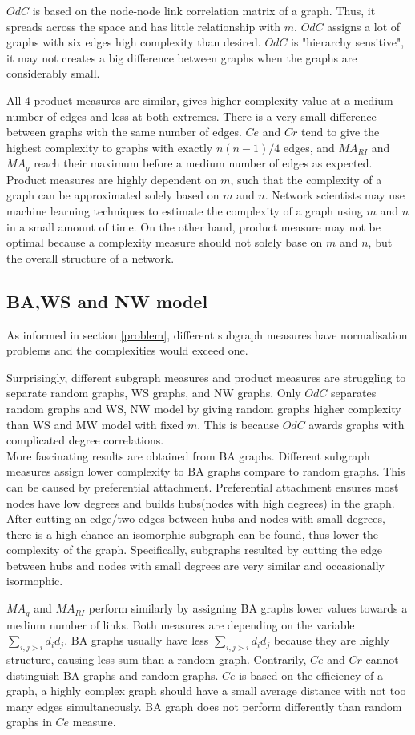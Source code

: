 \documentclass[12pt]{article}
\begin{document}
$OdC$ is based on the node-node link correlation matrix of a graph.\cite{odc} Thus, it spreads across the space and has little relationship with $m$. $OdC$ assigns a lot of graphs with six edges high complexity than desired. $OdC$ is "hierarchy sensitive", it may not creates a big difference between graphs when the graphs are considerably small.\par

All 4 product measures are similar, gives higher complexity value at a medium number of edges and less at both extremes. There is a very small difference between graphs with the same number of edges. $Ce$ and $Cr$ tend to give the highest complexity to graphs with exactly $n(n-1)/4$ edges, and $MA_{RI}$ and $MA_{g}$ reach their maximum before a medium number of edges as expected. Product measures are highly dependent on $m$, such that the complexity of a graph can be approximated solely based on $m$ and $n$. Network scientists may use machine learning techniques to estimate the complexity of a graph using $m$ and $n$ in a small amount of time. On the other hand, product measure may not be optimal because a complexity measure should not solely base on $m$ and $n$, but the overall structure of a network.


\subsection{BA,WS and NW model}
As informed in section \ref{problem}, different subgraph measures have normalisation problems and the complexities would exceed one.\par
Surprisingly, different subgraph measures and product measures are struggling to separate random graphs, WS graphs, and NW graphs. Only $OdC$ separates random graphs and WS, NW model by giving random graphs higher complexity than WS and MW model with fixed $m$. This is because $OdC$ awards graphs with complicated degree correlations.\\
More fascinating results are obtained from BA graphs. Different subgraph measures assign lower complexity to BA graphs compare to random graphs. This can be caused by preferential attachment. Preferential attachment ensures most nodes have low degrees and builds hubs(nodes with high degrees) in the graph. After cutting an edge/two edges between hubs and nodes with small degrees, there is a high chance an isomorphic subgraph can be found, thus lower the complexity of the graph. Specifically, subgraphs resulted by cutting the edge between hubs and nodes with small degrees are very similar and occasionally isormophic.\par
$MA_g$ and $MA_{RI}$ perform similarly by assigning BA graphs lower values towards a medium number of links. Both measures are depending on the variable $\sum_{i,j>i}d_id_j$. BA graphs usually have less $\sum_{i,j>i}d_id_j$ because they are highly structure, causing less sum than a random graph. Contrarily, $Ce$ and $Cr$ cannot distinguish BA graphs and random graphs. $Ce$ is based on the efficiency of a graph, a highly complex graph should have a small average distance with not too many edges simultaneously. BA graph does not perform differently than random graphs in $Ce$ measure.\\
\end{document}
